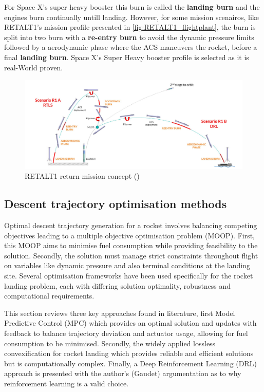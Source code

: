 For Space X's super heavy booster this burn is called the \textbf{landing burn} and the engines burn continually untill landing. However, for some mission scenairos, like RETALT1's mission profile presented in \autoref{fig:RETALT1_flightplant}, the burn is split into two burn with a \textbf{re-entry burn} to avoid the dynamic pressure limits followed by a aerodynamic phase where the ACS maneuvers the rocket, before a final \textbf{landing burn}. Space X's Super Heavy booster profile is selected as it is real-World proven.

\begin{figure}[H]
    \centering
    \includegraphics[width=0.95\linewidth]{figures/LiteratureStudy/RETALT1landing.png}
    \caption{RETALT1 return mission concept (\cite{dezaiacomo2022retalt})}
    \label{fig:RETALT1_flightplant}
\end{figure}

\subsection{Descent trajectory optimisation methods}
\label{sec:traj_obj_descent}

Optimal descent trajectory generation for a rocket involves balancing competing objectives leading to a multiple objective optimisation problem (MOOP). First, this MOOP aims to minimise fuel consumption while providing feasibility to the solution. Secondly, the solution must manage strict constraints throughout flight on variables like dynamic pressure and also terminal conditions at the landing site. Several optimisation frameworks have been used specifically for the rocket landing problem, each with differing solution optimality, robustness and computational requirements.

This section reviews three key approaches found in literature, first Model Predictive Control (MPC) which provides an optimal solution and updates with feedback to balance trajectory deviation and actuator usage, allowing for fuel consumption to be minimised. Secondly, the widely applied lossless convexification for rocket landing which provides reliable and efficient solutions but is computationally complex. Finally, a Deep Reinforcement Learning (DRL) approach is presented with the author's (Gaudet) argumentation as to why reinforcement learning is a valid choice.

